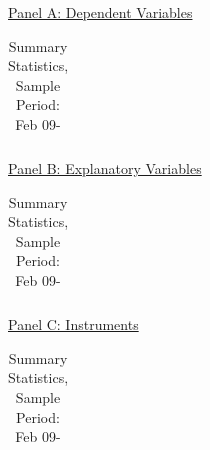 \begin{table}
\caption[\emph{Jan24_Summary_table(A-B-C)} \newline Analysis.092011.OutputBasicResults.do]
	{Summary Statistics, Sample Period: Feb 09-\finaldate}
\label{SummStats}
\centering
\underline{Panel A: Dependent Variables}
    \begin{tabular}{  p{3.5in} |  l l l l l}
    
   \end{tabular}
\newline\newline
\underline{Panel B: Explanatory Variables}
    \begin{tabular}{  p{3.5in} | l l l l l}
    
    \end{tabular}
\newline\newline
\underline{Panel C: Instruments}
    \begin{tabular}{  p{3.5in} | l l l l l}
    
    \end{tabular}
\newline\newline
\end{table}